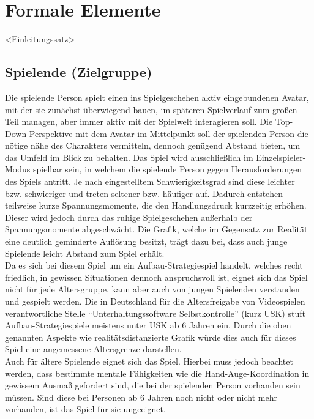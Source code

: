 \documentclass[paper=A4,pagesize=auto,12pt,headinclude=true,footinclude=true,BCOR=0mm,DIV=calc]{scrartcl}
\newcommand{\sectionspace}{
	\vspace{0.5cm}
}
\begin{document}
\sectionspace
\section{Formale Elemente}\label{sec:Formale_Elemente}
<Einleitungssatz>

\sectionspace
\subsection{Spielende (Zielgruppe)}\label{sec:Spieler}
Die spielende Person spielt einen ins Spielgeschehen aktiv eingebundenen Avatar, mit der sie zunächst überwiegend bauen, im späteren Spielverlauf zum großen Teil managen, aber immer aktiv mit der Spielwelt interagieren soll. Die Top-Down Perspektive mit dem Avatar im Mittelpunkt soll der spielenden Person die nötige nähe des Charakters vermitteln, dennoch genügend Abstand bieten, um das Umfeld im Blick zu behalten. Das Spiel wird ausschließlich im Einzelspieler-Modus spielbar sein, in welchem die spielende Person gegen Herausforderungen des Spiels antritt. Je nach eingestelltem Schwierigkeitsgrad sind diese leichter bzw. schwieriger und treten seltener bzw. häufiger auf. Dadurch entstehen teilweise kurze Spannungsmomente, die den Handlungsdruck kurzzeitig erhöhen. Dieser wird jedoch durch das ruhige Spielgeschehen außerhalb der Spannungsmomente abgeschwächt. Die Grafik, welche im Gegensatz zur Realität eine deutlich geminderte Auflösung besitzt, trägt dazu bei, dass auch junge Spielende leicht Abstand zum Spiel erhält.\\
Da es sich bei diesem Spiel um ein Aufbau-Strategiespiel handelt, welches recht friedlich, in gewissen Situationen dennoch anspruchsvoll ist, eignet sich das Spiel nicht für jede Altersgruppe, kann aber auch von jungen Spielenden verstanden und gespielt werden. Die in Deutschland für die Altersfreigabe von Videospielen verantwortliche Stelle "`Unterhaltungssoftware Selbstkontrolle"' (kurz USK) stuft Aufbau-Strategiespiele meistens unter USK ab 6 Jahren \cite{usk_6} ein. Durch die oben genannten Aspekte wie realitätsdistanzierte Grafik würde dies auch für dieses Spiel eine angemessene Altersgrenze darstellen. \\ 
Auch für ältere Spielende eignet sich das Spiel. Hierbei muss jedoch beachtet werden, dass bestimmte mentale Fähigkeiten wie die Hand-Auge-Koordination in gewissem Ausmaß gefordert sind, die bei der spielenden Person vorhanden sein müssen. Sind diese bei Personen ab 6 Jahren noch nicht oder nicht mehr vorhanden, ist das Spiel für sie ungeeignet.
\end{document}
